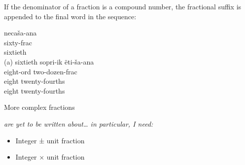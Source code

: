 \documentclass[grammar]{subfiles}
\begin{document}
  If the denominator of a fraction is a compound number, the fractional suffix is appended to the final word in the sequence:

  \begin{exe}
    \ex
    \begin{xlist}
      \ex {}
      \glll necaša-ana\\
      sixty-\acs{frac}\\
      sixtieth\\
      \glt (a) sixtieth
      \ex {}
      \glll sopri-ik ëti-ša-ana\\
      eight-\acs{ord} two-dozen-\acs{frac}\\
      eight twenty-fourths\\
      \glt eight twenty-fourths
    \end{xlist}
  \end{exe}


  More complex fractions {\em are yet to be written about… in particular, I need:
    \begin{itemize}
      \item Integer ± unit fraction
      \item Integer × unit fraction
    \end{itemize}
  }
\end{document}
